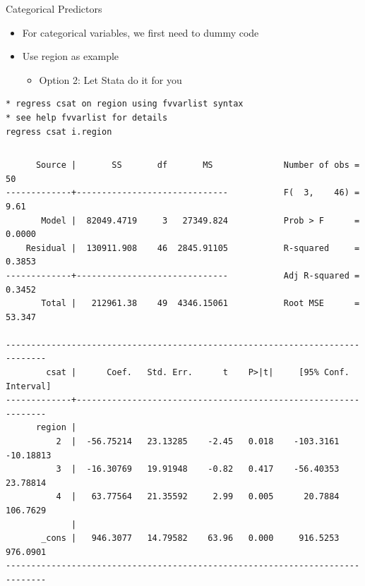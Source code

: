 \documentclass[table,smaller]{beamer}
\begin{document}
\begin{frame}[fragile,label=sec-4-4]{Categorical Predictors}
 \begin{itemize}
\item For categorical variables, we first need to dummy code
\item Use region as example
\begin{itemize}
\item Option 2: Let Stata do it for you
\end{itemize}
\end{itemize}


\begin{verbatim}
* regress csat on region using fvvarlist syntax
* see help fvvarlist for details
regress csat i.region
\end{verbatim}


\vspace{-.5em}
\begin{columns}
\begin{block}{}
\begin{verbatim}
      Source |       SS       df       MS              Number of obs =      50
-------------+------------------------------           F(  3,    46) =    9.61
       Model |  82049.4719     3   27349.824           Prob > F      =  0.0000
    Residual |  130911.908    46  2845.91105           R-squared     =  0.3853
-------------+------------------------------           Adj R-squared =  0.3452
       Total |   212961.38    49  4346.15061           Root MSE      =  53.347

------------------------------------------------------------------------------
        csat |      Coef.   Std. Err.      t    P>|t|     [95% Conf. Interval]
-------------+----------------------------------------------------------------
      region |
          2  |  -56.75214   23.13285    -2.45   0.018    -103.3161   -10.18813
          3  |  -16.30769   19.91948    -0.82   0.417    -56.40353    23.78814
          4  |   63.77564   21.35592     2.99   0.005      20.7884    106.7629
             |
       _cons |   946.3077   14.79582    63.96   0.000     916.5253    976.0901
------------------------------------------------------------------------------
\end{verbatim}
\end{block}
\end{columns}
\vspace{.5em}
\end{frame}
\end{document}

